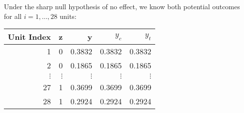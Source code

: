 \documentclass[11pt]{article}\usepackage[]{graphicx}\usepackage[]{color}
\theoremstyle{newstyle}
\begin{document}
Under the sharp null hypothesis of no effect, we know both potential outcomes for all $i = 1 , \dots , 28$ units:

\begin{table}[ht]
\centering
\begin{tabular}{rrrrr}
\hline
Unit Index & z & y & $y_c$ & $y_t$ \\ 
\hline
1  & 0  & 0.3832 & 0.3832 & 0.3832 \\ 
2  & 0  & 0.1865 & 0.1865 & 0.1865 \\ 
$\vdots$ & $\vdots$  & $\vdots$ & $\vdots$ & $\vdots$ \\ 
27 & 1  & 0.3699 & 0.3699 & 0.3699 \\ 
28 & 1  & 0.2924 & 0.2924 & 0.2924 \\ 
\hline
\end{tabular}
\end{table}
\end{document}

